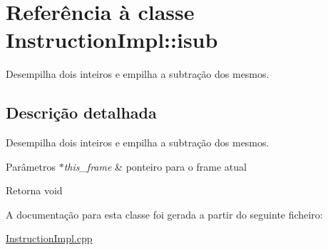 \hypertarget{class_instruction_impl_1_1isub}{}\section{Referência à classe Instruction\+Impl\+:\+:isub}
\label{class_instruction_impl_1_1isub}


Desempilha dois inteiros e empilha a subtração dos mesmos.  




\subsection{Descrição detalhada}
Desempilha dois inteiros e empilha a subtração dos mesmos. 


\begin{DoxyParams}{Parâmetros}
{\em $\ast$this\+\_\+frame} & ponteiro para o frame atual \\
\hline
\end{DoxyParams}
\begin{DoxyReturn}{Retorna}
void 
\end{DoxyReturn}


A documentação para esta classe foi gerada a partir do seguinte ficheiro\+:\begin{DoxyCompactItemize}
\item 
\hyperlink{_instruction_impl_8cpp}{Instruction\+Impl.\+cpp}\end{DoxyCompactItemize}
